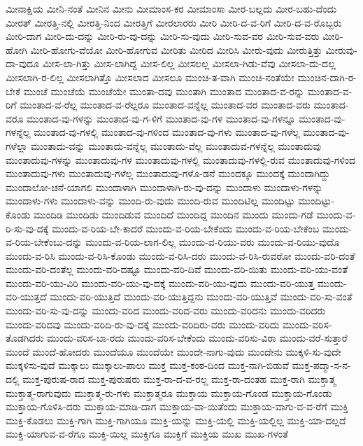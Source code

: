 {ಮೀನಾಕ್ಷಿಯ
ಮೀನಿ-ನಂತೆ
ಮೀನಿನ
ಮೀನು
ಮೀಮಾಂಸ-ಕರ
ಮೀಮಾಂಸಾ
ಮೀರ-ಬಲ್ಲದು
ಮೀರ-ಬಹು-ದೆಂದು
ಮೀರತ್
ಮೀರತ್ತಿ-ನಲ್ಲಿ
ಮೀರತ್ತಿ-ನಿಂದ
ಮೀರತ್ತಿಗೆ
ಮೀರಲಾರರು
ಮೀರಿ
ಮೀರಿ-ದ-ವ-ರಿಗೆ
ಮೀರಿ-ದ-ವ-ರೊಬ್ಬರು
ಮೀರಿ-ದಾಗ
ಮೀರಿ-ದು-ದನ್ನು
ಮೀರಿ-ರು-ವು-ದನ್ನು
ಮೀರಿ-ಸು-ವುದು
ಮೀರಿ-ಸುವ-ವರ
ಮೀರಿ-ಸುವ-ವರು
ಮೀರಿ-ಹೋಗಿ
ಮೀರಿ-ಹೋಗು-ವೆಯೋ
ಮೀರಿ-ಹೋಗುವ
ಮೀರಿತು
ಮೀರಿದ
ಮೀರಿಸಿ
ಮೀರು-ವುದು
ಮೀರುತ್ತಿತ್ತು
ಮೀರುವು-ದಾ-ವುದೂ
ಮೀಸ-ಲಾ-ಗಿತ್ತು
ಮೀಸ-ಲಾಗಿದ್ದ
ಮೀಸ-ಲಿಲ್ಲ
ಮೀಸಲಲ್ಲ
ಮೀಸಲಾ-ಗಿಡು-ವೆವು
ಮೀಸಲಾ-ದು-ದಲ್ಲ
ಮೀಸಲಾಗಿ-ರ-ಲಿಲ್ಲ
ಮೀಸಲಾಗಿತ್ತೊ
ಮೀಸಲಾದ
ಮೀಸಲೂ
ಮುಂಚಿ-ತ-ವಾಗಿ
ಮುಂಚಿ-ನಂತೆಯೇ
ಮುಂಚಿನ-ದಾಗಿ-ರ-ಬೇಕೆ
ಮುಂಚೆ
ಮುಂಚೆಯೆ
ಮುಂಚೆಯೇ
ಮುಂತಾ-ದವು
ಮುಂತಾಗಿ
ಮುಂತಾದ
ಮುಂತಾದ-ವ-ರನ್ನು
ಮುಂತಾದ-ವ-ರಿಗೆ
ಮುಂತಾದ-ವ-ರೆಲ್ಲ
ಮುಂತಾದ-ವ-ರೆಲ್ಲರೂ
ಮುಂತಾದ-ವನ್ನೆಲ್ಲ
ಮುಂತಾದ-ವರ
ಮುಂತಾದ-ವರು
ಮುಂತಾದ-ವರೂ
ಮುಂತಾದ-ವು-ಗಳನ್ನು
ಮುಂತಾದ-ವು-ಗ-ಳಿಗೆ
ಮುಂತಾದ-ವು-ಗಳ
ಮುಂತಾದ-ವು-ಗಳನ್ನೂ
ಮುಂತಾದ-ವು-ಗಳನ್ನೆಲ್ಲ
ಮುಂತಾದ-ವು-ಗಳಲ್ಲಿ
ಮುಂತಾದ-ವು-ಗಳಿಂದ
ಮುಂತಾದ-ವು-ಗಳು
ಮುಂತಾದ-ವು-ಗಳೆಲ್ಲ
ಮುಂತಾದ-ವು-ಗಳೆಲ್ಲಾ
ಮುಂತಾದು-ವನ್ನು
ಮುಂತಾದು-ವನ್ನೆಲ್ಲ
ಮುಂತಾದು-ವೆಲ್ಲ
ಮುಂತಾದುವ-ಗಳನ್ನೆಲ್ಲ
ಮುಂತಾದುವು
ಮುಂತಾದುವು-ಗಳನ್ನು
ಮುಂತಾದುವು-ಗಳ
ಮುಂತಾದುವು-ಗಳಲ್ಲಿ
ಮುಂತಾದುವು-ಗಳಲ್ಲಿ-ರುವ
ಮುಂತಾದುವು-ಗಳಿಂದ
ಮುಂತಾದುವು-ಗಳು
ಮುಂತಾದುವು-ಗಳೆಲ್ಲ
ಮುಂತಾದುವು-ಗಳೊ-ಡನೆ
ಮುಂದಕ್ಕೂ
ಮುಂದಕ್ಕೆ
ಮುಂದಾಗಿದ್ದು
ಮುಂದಾಲೋ-ಚನೆ-ಯಾಗಲಿ
ಮುಂದಾಳಾಗಿ
ಮುಂದಾಳಾಗಿ-ರು-ವು-ದನ್ನು
ಮುಂದಾಳು
ಮುಂದಾಳು-ಗಳನ್ನು
ಮುಂದಾಳು-ಗಳು
ಮುಂದಾಳು-ವನ್ನು
ಮುಂದಿ-ರು-ವುದು
ಮುಂದಿ-ರುವ
ಮುಂದಿಟಿಲ್ಲ
ಮುಂದಿಟ್ಟು
ಮುಂದಿಟ್ಟು-ಕೊಂಡು
ಮುಂದಿಡಿ
ಮುಂದಿಡು
ಮುಂದಿಡುವ
ಮುಂದಿದೆ
ಮುಂದಿದ್ದ
ಮುಂದಿನ
ಮುಂದು
ಮುಂದು-ಗಡೆ
ಮುಂದು-ವ-ರಿ-ಸು-ವು-ದಕ್ಕೆ
ಮುಂದು-ವ-ರಿಯ-ಬೇ-ಕಾದರೆ
ಮುಂದು-ವ-ರಿಯ-ಬೇಕೆಂದು
ಮುಂದು-ವ-ರಿಯ-ಬೇಕೆಂಬ
ಮುಂದು-ವ-ರಿಯ-ಬೇಕೆಂಬು-ದನ್ನು
ಮುಂದು-ವ-ರಿಯ-ಲಾಗ-ಲಿಲ್ಲ
ಮುಂದು-ವ-ರಿಯು-ವರು
ಮುಂದು-ವ-ರಿಯು-ವುದೊ
ಮುಂದು-ವ-ರಿಸಿ
ಮುಂದು-ವ-ರಿಸಿ-ಕೊಂಡು
ಮುಂದು-ವ-ರಿಸಿ-ದರು
ಮುಂದು-ವ-ರಿಸಿ-ರುವರೋ
ಮುಂದು-ವರಿ-ದಂತೆ
ಮುಂದು-ವರಿ-ದಂತೆಲ್ಲ
ಮುಂದು-ವರಿ-ದಷ್ಟೂ
ಮುಂದು-ವರಿ-ದಿವೆ
ಮುಂದು-ವರಿ-ಯಿತು
ಮುಂದು-ವರಿ-ಯು-ವಂತೆ
ಮುಂದು-ವರಿ-ಯು-ವಿರಿ
ಮುಂದು-ವರಿ-ಯು-ವು-ದಕ್ಕೆ
ಮುಂದು-ವರಿ-ಯು-ವುದು
ಮುಂದು-ವರಿ-ಯುತ್ತ
ಮುಂದು-ವರಿ-ಯುತ್ತದೆ
ಮುಂದು-ವರಿ-ಯುತ್ತಿದೆ
ಮುಂದು-ವರಿ-ಯುತ್ತಿದ್ದನು
ಮುಂದು-ವರಿ-ಯುತ್ತಿವೆ
ಮುಂದು-ವರಿ-ಸು-ವಂತೆ
ಮುಂದು-ವರಿ-ಸು-ವು-ದನ್ನು
ಮುಂದು-ವರಿದ
ಮುಂದು-ವರಿದ-ವರು
ಮುಂದು-ವರಿದನು
ಮುಂದು-ವರಿದರು
ಮುಂದು-ವರಿದವು
ಮುಂದು-ವರಿದಿ-ರು-ವು-ದಕ್ಕೆ
ಮುಂದು-ವರಿದಿರು-ವರು
ಮುಂದು-ವರಿದು
ಮುಂದು-ವರಿಸ-ತೊಡಗಿದರು
ಮುಂದು-ವರಿಸ-ಬಾ-ರದು
ಮುಂದು-ವರಿಸ-ಬೇಕೆಂದು
ಮುಂದು-ವರಿಸು-ವಿರಾ
ಮುಂದು-ವರೆ-ಸುತ್ತಾರೆ
ಮುಂದೆ
ಮುಂದೆ-ಹೋದರು
ಮುಂದೆಯೂ
ಮುಂದೆಯೇ
ಮುಂದೇ-ನಾಗು-ವುದು
ಮುಂದೇನು
ಮುಕ್ಕಳಿ-ಸು-ವುದೇ
ಮುಕ್ಕಳಿಸು-ವುದೆ
ಮುಕ್ಕಾಲು
ಮುಕ್ಕಾಲು-ಪಾಲು
ಮುಕ್ತ
ಮುಕ್ತ-ಕಂಠ-ದಿಂದ
ಮುಕ್ತ-ನಾಗಿ-ಬಿಡುವೆ
ಮುಕ್ತ-ಪದ್ಮಾ-ಸ-ನ-ದಲ್ಲಿ
ಮುಕ್ತ-ಪುರುಷ-ರಾದ
ಮುಕ್ತ-ಪುರುಷರು
ಮುಕ್ತ-ರಾ-ದ-ವ-ರಲ್ಲ
ಮುಕ್ತ-ರಾ-ದಂತಹ
ಮುಕ್ತ-ರಾಗಿ
ಮುಕ್ತಾತ್ಮ
ಮುಕ್ತಾತ್ಮ-ರಾಗುವುದು
ಮುಕ್ತಾತ್ಮ-ರು-ಗಳು
ಮುಕ್ತಾತ್ಮರೂ
ಮುಕ್ತಾಯ
ಮುಕ್ತಾಯ-ಗೊಂಡ
ಮುಕ್ತಾಯ-ಗೊಂಡು
ಮುಕ್ತಾಯ-ಗೊಳಿಸಿ-ದರು
ಮುಕ್ತಾಯ-ಮಾಡಿ-ದಾಗ
ಮುಕ್ತಾಯ-ವಾ-ಯಿತೆಂದು
ಮುಕ್ತಾಯ-ವಾಗು-ವ-ವ-ರೆಗೆ
ಮುಕ್ತಿ
ಮುಕ್ತಿ-ಕೊಡಲು
ಮುಕ್ತಿ-ಗಾಗಿ
ಮುಕ್ತಿ-ಗಾಗಿಯೂ
ಮುಕ್ತಿ-ಯನ್ನು
ಮುಕ್ತಿ-ಯಲ್ಲಿ
ಮುಕ್ತಿ-ಯಲ್ಲಿಲ್ಲ
ಮುಕ್ತಿ-ಯಾ-ದಲ್ಲದೆ
ಮುಕ್ತಿ-ಯಾಗುವ-ವ-ರೆಗೂ
ಮುಕ್ತಿ-ಯಿಲ್ಲ
ಮುಕ್ತಿಗೂ
ಮುಕ್ತಿಗೆ
ಮುಕ್ತಿಯ
ಮುಖ
ಮುಖ-ಗಳಂತೆ
}
